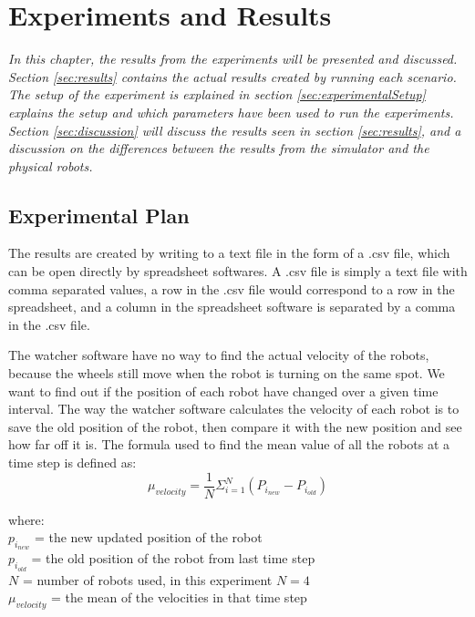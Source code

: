 \chapter{Experiments and Results}
\label{cha:ResearchAndResults}

{\it In this chapter, the results from the experiments will be presented and discussed. Section \ref{sec:results} contains the actual results created by running each scenario. The setup of the experiment is explained in section \ref{sec:experimentalSetup} explains the setup and which parameters have been used to run the experiments.
Section \ref{sec:discussion} will discuss the results seen in section \ref{sec:results}, and a discussion on the differences between the results from the simulator and the physical robots.}

\section{Experimental Plan}
\label{sec:experimentalPlan}

The results are created by writing to a text file in the form of a .csv file, which can be open directly by spreadsheet softwares. A .csv file is simply a text file with comma separated values, a row in the .csv file would correspond to a row in the spreadsheet, and a column in the spreadsheet software is separated by a comma in the .csv file.

The watcher software have no way to find the actual velocity of the robots, because the wheels still move when the robot is turning on the same spot. We want to find out if the position of each robot have changed over a given time interval.
The way the watcher software calculates the velocity of each robot is to save the old position of the robot, then compare it with the new position and see how far off it is.
The formula used to find the mean value of all the robots at a time step is defined as:
\begin{equation}
\label{eq:muvel}
\mu_{velocity} = \frac{1}{N} \Sigma_{i=1}^N (P_{i_{new}} - P_{i_{old}})
\end{equation}

where:
\\
$p_{i_{new}}$ = the new updated position of the robot
\\
$p_{i_{old}}$ = the old position of the robot from last time step
\\
$N$ = number of robots used, in this experiment $N = 4$ 
\\
$\mu_{velocity}$ = the mean of the velocities in that time step


